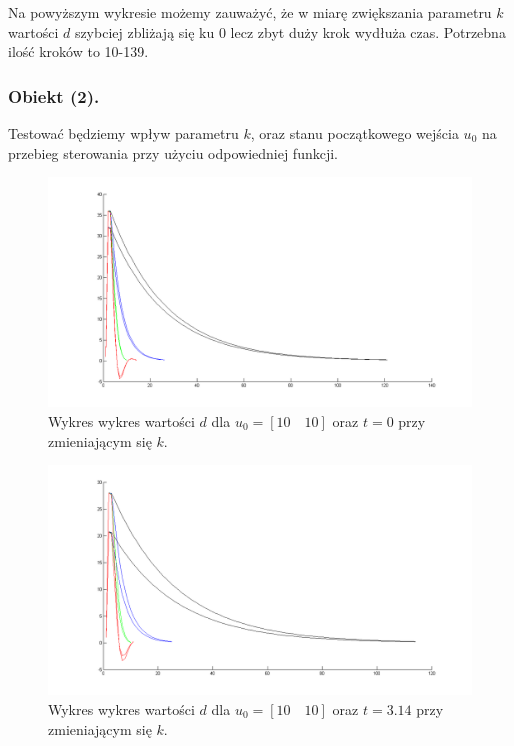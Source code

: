 \documentclass[a4paper,10pt]{article}
\begin{document}
Na powyższym wykresie możemy zauważyć, że w miarę zwiększania parametru $k$ wartości $d$ szybciej zbliżają się ku $0$ lecz zbyt duży krok wydłuża czas. Potrzebna ilość kroków to 10-139.


\newpage
\subsubsection{Obiekt (2).}

Testować będziemy wpływ parametru $k$, oraz stanu początkowego wejścia $u_0$ na przebieg sterowania przy użyciu odpowiedniej funkcji.




\begin{figure}[!h]
    \centering
	\includegraphics[width=120mm]{CW4-alg3fun2-u10_10-k001_01-t0-d.png}							      
	\caption{Wykres wykres wartości $d$ dla $u_0=[10 \quad 10]$ oraz $t=0$ przy zmieniającym się $k$.}
    \label{fig:Rysunek}
\end{figure}
\begin{figure}[!h]
    \centering
	\includegraphics[width=120mm]{CW4-alg3fun2-u10_10-k001_01-t314-d.png}
	\caption{Wykres wykres wartości $d$ dla $u_0=[10 \quad 10]$ oraz $t=3.14$ przy zmieniającym się $k$.}
    \label{fig:Rysunek}
\end{figure}
\end{document}
